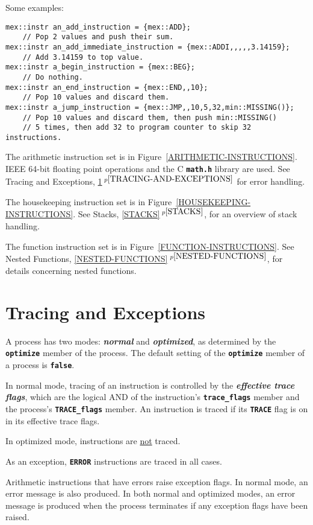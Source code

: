 \documentclass[12pt]{article}
\newcommand{\TT}[1]{{\tt \bfseries #1}}
\newcommand{\key}[1]{{\bf \em #1}\index{#1}}
\newcommand{\itemref}[1]{\ref{#1}$\,^{p\pageref{#1}}$}
\newenvironment{indpar}[1][0.3in]%
	{\begin{list}{}%
		     {\setlength{\itemsep}{0in}%
		      \setlength{\topsep}{0in}%
		      \setlength{\parsep}{1ex}%
		      \setlength{\labelwidth}{#1}%
		      \setlength{\leftmargin}{#1}%
		      \addtolength{\leftmargin}{\labelsep}}%
	 \item}%
	{\end{list}}
\begin{document}
Some examples:
\begin{indpar}\begin{verbatim}
mex::instr an_add_instruction = {mex::ADD};
    // Pop 2 values and push their sum.
mex::instr an_add_immediate_instruction = {mex::ADDI,,,,,3.14159};
    // Add 3.14159 to top value.
mex::instr a_begin_instruction = {mex::BEG};
    // Do nothing.
mex::instr an_end_instruction = {mex::END,,10};
    // Pop 10 values and discard them.
mex::instr a_jump_instruction = {mex::JMP,,10,5,32,min::MISSING()};
    // Pop 10 values and discard them, then push min::MISSING()
    // 5 times, then add 32 to program counter to skip 32 instructions.
\end{verbatim}\end{indpar}

The arithmetic instruction set is in Figure~\ref{ARITHMETIC-INSTRUCTIONS}.
IEEE 64-bit floating point operations and the C \TT{math.h}
library are used.  See Tracing and Exceptions,
\itemref{TRACING-AND-EXCEPTIONS} for error
handling.

The housekeeping instruction set is in
Figure~\ref{HOUSEKEEPING-INSTRUCTIONS}.
See Stacks, \itemref{STACKS}, for an overview of stack handling.

The function instruction set is in
Figure~\ref{FUNCTION-INSTRUCTIONS}.
See Nested Functions, \itemref{NESTED-FUNCTIONS},
for details concerning nested functions.

\section{Tracing and Exceptions}
\label{TRACING-AND-EXCEPTIONS}

A process has two modes: \key{normal} and \key{optimized}, as
determined by the \TT{optimize} member of the process.
The default setting of the \TT{optimize} member of a process
is \TT{false}.

In normal mode, tracing of an instruction
is controlled by the \key{effective trace flags},
which are the logical AND of the instruction's \TT{trace\_flags}
member and the process's \TT{TRACE\_flags} member.
An instruction is traced if its \TT{TRACE} flag is on
in its effective trace flags.

In optimized mode, instructions are \underline{not} traced.

As an exception, \TT{ERROR} instructions are traced in all cases.

Arithmetic instructions that have errors raise exception flags.
In normal mode, an error message is also produced.  In both
normal and optimized modes, an error message is produced
when the process terminates if any exception flags have been raised.
\end{document}
